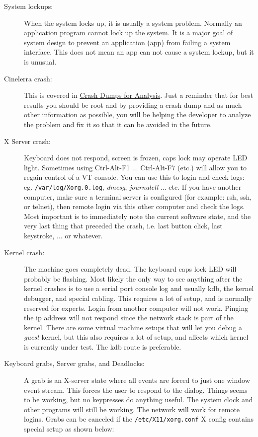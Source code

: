 \begin{description}
	\item[System lockups:] When the system locks up, it is usually a system problem.  Normally an application program cannot lock up the system.  It is a major goal of system design to prevent an application (app) from failing a system interface.  This does not mean an app can not cause a system lockup, but it is unusual.
	\item[Cinelerra crash:] This is covered in  \hyperref[cha:crash_dumps_analysis]{Crash Dumps for Analysis}.  Just a reminder that for best results you should be root and by providing a crash dump and as much other information as possible, you will be helping the developer to analyze the problem and fix it so that it can be avoided in the future.
	\item[X Server crash:] Keyboard does not respond, screen is frozen, caps lock may operate LED light.  Sometimes using Ctrl-Alt-F1 $\dots$ Ctrl-Alt-F7 (etc.) will allow you to regain control of a VT console.  You can use this to login and check logs: eg. \texttt{/var/log/Xorg.0.log}, \textit{dmesg}, \textit{journalctl} $\dots$ etc.  If you have another computer, make sure a terminal server is configured (for example: rsh, ssh, or telnet), then remote login via this other computer and check the logs.  Most important is to immediately note the current software state, and the very last thing that preceded the crash, i.e. last button click, last keystroke, $\dots$ or whatever.
	\item[Kernel crash:] The machine goes completely dead.  The keyboard caps lock LED will probably be flashing.  Most likely the only way to see anything after the kernel crashes is to use a serial port console log and usually kdb, the kernel debugger, and special cabling.  This requires a lot of setup, and is normally reserved for experts.  Login from another computer will not work.  Pinging the ip address will not respond since the network stack is part of the kernel.  There are some virtual machine setups that will let you debug a \textit{guest} kernel, but this also requires a lot of setup, and affects which kernel is currently under test.  The kdb route is preferable.
	\item[Keyboard grabs, Server grabs, and Deadlocks:] A grab is an X-server state where all events are forced to just one window event stream.  This forces the user to respond to the dialog.  Things seems to be working, but no keypresses do anything useful. The system clock and other programs will still be working.  The network will work for remote logins. Grabs can be canceled if the \texttt{/etc/X11/xorg.conf} X config contains special setup as shown below:
\end{description}

